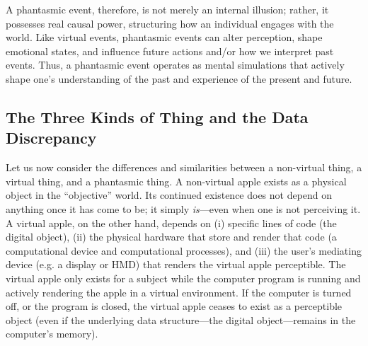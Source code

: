 \documentclass{article}
\begin{document}
A phantasmic event, therefore, is not merely an internal illusion; rather, it possesses real causal power, structuring how an individual engages with the world. Like virtual events, phantasmic events can alter perception, shape emotional states, and influence future actions and/or how we interpret past events. Thus, a phantasmic event operates as mental simulations that actively shape one's understanding of the past and experience of the present and future.

\subsection*{The Three Kinds of Thing and the Data Discrepancy}

Let us now consider the differences and similarities between a non-virtual thing, a virtual thing, and a phantasmic thing. A non-virtual apple exists as a physical object in the ``objective'' world. Its continued existence does not depend on anything once it has come to be; it simply \textit{is}—even when one is not perceiving it. A virtual apple, on the other hand, depends on (i) specific lines of code (the digital object), (ii) the physical hardware that store and render that code (a computational device and computational processes), and (iii) the user's mediating device (e.g. a display or HMD) that renders the virtual apple perceptible. The virtual apple only exists for a subject while the computer program is running and actively rendering the apple in a virtual environment. If the computer is turned off, or the program is closed, the virtual apple ceases to exist as a perceptible object (even if the underlying data structure—the digital object—remains in the computer's memory).
\end{document}
